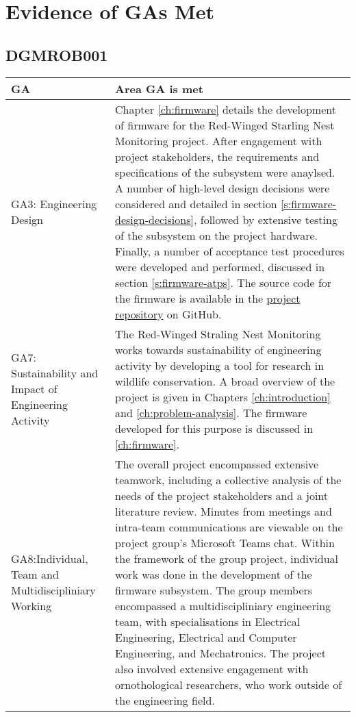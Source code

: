 \documentclass[class=report,11pt,crop=false]{standalone}
\begin{document}
\ifstandalone
\tableofcontents
\fi


\chapter{Evidence of GAs Met}

\section{DGMROB001}

\centering
\begin{tabularx}{\textwidth}{|p{} X|}

    \hline
    \textbf{GA}  & \textbf{Area GA is met} \\ \hline

    GA3: Engineering Design & Chapter \ref{ch:firmware} details the development of firmware for the Red-Winged Starling Nest Monitoring project. After engagement with project stakeholders, the requirements and specifications of the subsystem were anaylsed. A number of high-level design decisions were considered and detailed in section \ref{s:firmware-design-decisions}, followed by extensive testing of the subsystem on the project hardware. Finally, a number of acceptance test procedures were developed and performed, discussed in section \ref{s:firmware-atps}. The source code for the firmware is available in the \href{https://github.com/rothdu/EEE4113F-Group13-2024}{project repository} on GitHub. \\ \hline

    GA7: Sustainability and Impact of Engineering Activity & The Red-Winged Straling Nest Monitoring works towards sustainability of engineering activity by developing a tool for research in wildlife conservation. A broad overview of the project is given in Chapters \ref{ch:introduction} and \ref{ch:problem-analysis}. The firmware developed for this purpose is discussed in \ref{ch:firmware}.\\ \hline

    GA8:Individual, Team and Multidiscipliniary Working & The overall project encompassed extensive teamwork, including a collective analysis of the needs of the project stakeholders and a joint literature review. Minutes from meetings and intra-team communications are viewable on the project group's Microsoft Teams chat. Within the framework of the group project, individual work was done in the development of the firmware subsystem. The group members encompassed a multidiscipliniary engineering team, with specialisations in Electrical Engineering, Electrical and Computer Engineering, and Mechatronics. The project also involved extensive engagement with ornothological researchers, who work outside of the engineering field. \\ \hline


\end{tabularx}
\end{document}
